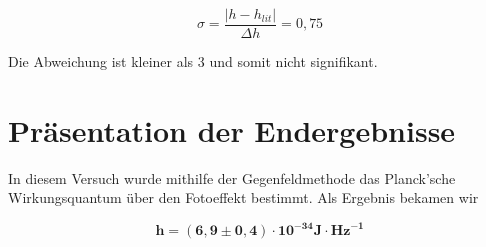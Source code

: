 \documentclass{article}
\begin{document}
\begin{equation}
    \sigma = \frac{\left| h - h_{lit} \right|}{\Delta h} = 0,75
\end{equation}

Die Abweichung ist kleiner als 3 und somit nicht signifikant.




\newpage

\section{Präsentation der Endergebnisse}

In diesem Versuch wurde mithilfe der Gegenfeldmethode das Planck'sche Wirkungsquantum über den Fotoeffekt bestimmt. Als Ergebnis bekamen wir  

\begin{equation}
    \bm{h} = \bm{(6,9 \pm 0,4) \cdot 10^{-34} \textbf{J} \cdot \textbf{Hz}^{-1}} 
\end{equation}
\end{document}
